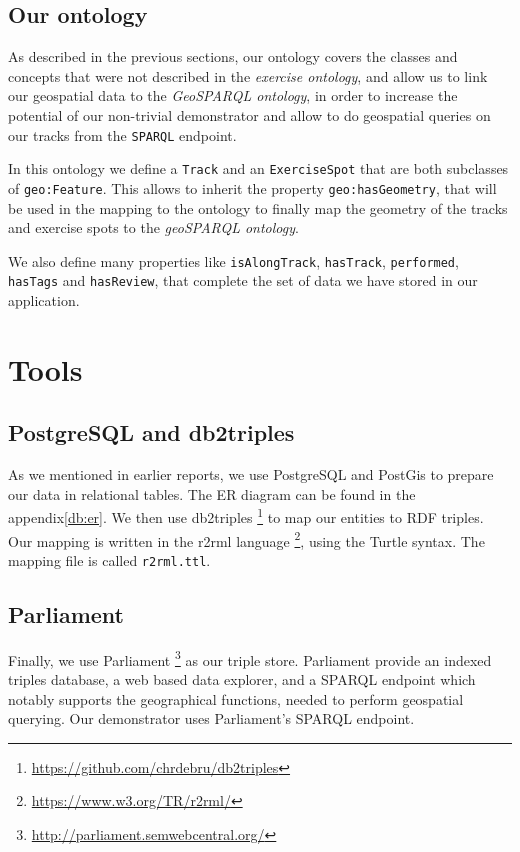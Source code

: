 \documentclass[11pt,a4paper]{scrreprt}
\begin{document}
\section{Our ontology}
As described in the previous sections, our ontology covers the classes and concepts that were not described in the \textit{exercise ontology}, and allow us to link our geospatial data to the \textit{GeoSPARQL ontology}, in order to increase the potential of our non-trivial demonstrator and allow to do geospatial queries on our tracks from the \texttt{SPARQL} endpoint.

In this ontology we define a \texttt{Track} and an \texttt{ExerciseSpot} that are both subclasses of \texttt{geo:Feature}. This allows to inherit the property \texttt{geo:hasGeometry}, that will be used in the mapping to the ontology to finally map the geometry of the tracks and exercise spots to the \textit{geoSPARQL ontology}.

We also define many properties like \texttt{isAlongTrack}, \texttt{hasTrack}, \texttt{performed}, \texttt{hasTags} and \texttt{hasReview}, that complete the set of data we have stored in our application.

\chapter{Tools}
\section{PostgreSQL and db2triples}
As we mentioned in earlier reports, we use PostgreSQL and PostGis to prepare our data in relational tables. The ER diagram can be found in the appendix\ref{db:er}.  We then use db2triples \footnote{\url{https://github.com/chrdebru/db2triples}} to map our entities to RDF triples. Our mapping is written in the r2rml language \footnote{\url{https://www.w3.org/TR/r2rml/}}, using the Turtle syntax. The mapping file is called \texttt{r2rml.ttl}.

\section{Parliament}
Finally, we use Parliament \footnote{\url{http://parliament.semwebcentral.org/}} as our triple store. Parliament provide an indexed triples database, a web based data explorer, and a SPARQL endpoint which notably supports the geographical functions, needed to perform geospatial querying. Our demonstrator uses Parliament's SPARQL endpoint.
\end{document}
